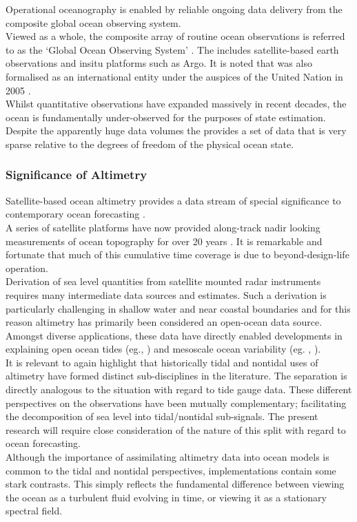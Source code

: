 Operational oceanography is enabled by reliable ongoing data delivery from the composite global ocean observing system.  \\
Viewed as a whole, the composite array of routine ocean observations is referred to as the `Global Ocean Observing System' \GOOS{} \citep{Komen:1999ch}.  The \GOOS{}    includes satellite-based earth observations and insitu platforms such as Argo.  It is noted that \GOOS{} was also formalised as an international entity under the auspices of the United Nation in 2005 \citep{IOC:2005wv}.\\
Whilst quantitative observations have expanded massively in recent decades,  the ocean is fundamentally under-observed for the purposes of state estimation. Despite the apparently huge data volumes the \GOOS{} provides a set of data that is very sparse relative to the degrees of freedom of the physical ocean state.\\




\subsubsection{Significance of Altimetry}
Satellite-based ocean altimetry provides a data stream of special significance to contemporary ocean forecasting \citep{Fu:2001ub}. \\


A series of satellite platforms have now provided along-track nadir looking measurements of ocean topography for over 20 years \citep{Wilson:2010hy}.   It is remarkable and fortunate that much of this cumulative time coverage is due to beyond-design-life operation. \\

Derivation of sea level quantities from satellite mounted radar instruments requires many intermediate data sources and estimates. Such a derivation is particularly challenging in shallow water and near coastal boundaries \citep{Woodworth:2011bf} and for this reason altimetry has primarily been considered an open-ocean data source.   Amongst diverse applications, these data have directly enabled developments in explaining open ocean tides (eg.\citet{Egbert:1996vr},  \citet{Lefevre:2011dg}) and mesoscale ocean variability (eg.  \citet{Wunsch:1998bq}, \citet{Chelton:vi}). \\
It is relevant to again highlight that historically tidal and nontidal uses of altimetry have formed distinct sub-disciplines in the literature.   The separation is directly analogous to the situation with regard to tide gauge data.  These different perspectives on the observations have been mutually complementary; facilitating the decomposition of sea level into tidal/nontidal sub-signals.    The present research will require close consideration of the nature of this split with regard to ocean forecasting.\\
Although the importance of assimilating altimetry data into ocean models is common to the tidal and nontidal perspectives, implementations contain some stark contrasts.  This simply reflects the fundamental difference between viewing the ocean as a turbulent fluid evolving in time, or viewing it as a stationary spectral field.
 
